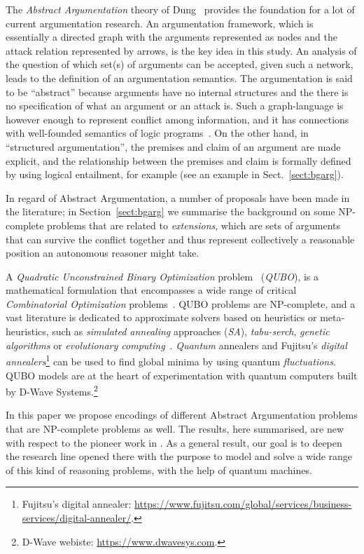 \documentclass[conference]{IEEEtran}
\begin{document}
The \emph{Abstract Argumentation} theory of Dung~\cite{Dung:1995} provides the foundation for a lot of current argumentation research. An argumentation framework, which is essentially a directed graph with the arguments represented as nodes and the attack relation represented by arrows, is the key idea in this study. An analysis of the question of which set(s) of arguments can be accepted, given such a network, leads to the definition of an argumentation semantics. 
The argumentation is said to be ``abstract'' because arguments have no internal structures and the there is no specification of what an argument or an attack is. Such a graph-language is however enough to represent conflict among information, and it has connections with well-founded semantics of logic programs~\cite{wellfounded}.
On the  other hand, in ``structured argumentation'',  the premises and claim of an argument are made explicit, and the relationship between the premises and claim is formally defined by using logical entailment, for example (see an example in Sect.~\ref{sect:bgarg}).

In regard of Abstract Argumentation, a number of proposals have been made in the literature; in Section~\ref{sect:bgarg} we summarise the background on  some NP-complete problems  that are related to \emph{extensions}, which are sets of arguments that can survive the conflict together and thus represent collectively a reasonable position an autonomous reasoner might take. 


A \emph{Quadratic Unconstrained Binary Optimization} problem~\cite{firstworkqubo} (\emph{QUBO}),  is a mathematical formulation that  encompasses a wide range of critical \emph{Combinatorial Optimization} problems~\cite{survey2,survey1}.  QUBO problems are  NP-complete, and a vast literature is dedicated to approximate solvers  based on heuristics or meta-heuristics, such as  \emph{simulated annealing} approaches (\emph{SA}), \emph{tabu-serch}, \emph{genetic algorithms} or \emph{evolutionary computing}~\cite{survey1}. \emph{Quantum} annealers  and Fujitsu's \emph{digital annealers}\footnote{Fujitsu's digital annealer: \url{https://www.fujitsu.com/global/services/business-services/digital-annealer/}.} can be used to find global minima by using quantum \emph{fluctuations}.  QUBO models are  at the heart of experimentation with quantum computers built by D-Wave Systems.\footnote{D-Wave webiste: \url{https://www.dwavesys.com}.}

In this paper we propose encodings of different Abstract Argumentation problems that are NP-complete problems as well. The  results, here summarised, are new with respect to the pioneer  work in \cite{pricai22}. As a general result, our goal is to deepen  the research line opened there with the purpose to model  and solve a wide range of this kind of reasoning problems, with the help of quantum machines.
\end{document}
